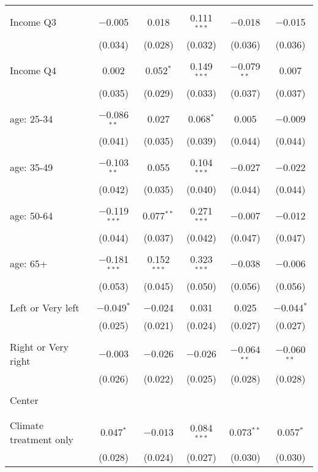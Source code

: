 \begin{tabular}{@{\extracolsep{5pt}}lccccc}
  & & & & & \\ 
 Income Q3 & $-$0.005 & 0.018 & 0.111$^{***}$ & $-$0.018 & $-$0.015 \\ 
  & (0.034) & (0.028) & (0.032) & (0.036) & (0.036) \\ 
  & & & & & \\ 
 Income Q4 & 0.002 & 0.052$^{*}$ & 0.149$^{***}$ & $-$0.079$^{**}$ & 0.007 \\ 
  & (0.035) & (0.029) & (0.033) & (0.037) & (0.037) \\ 
  & & & & & \\ 
 age: 25-34 & $-$0.086$^{**}$ & 0.027 & 0.068$^{*}$ & 0.005 & $-$0.009 \\ 
  & (0.041) & (0.035) & (0.039) & (0.044) & (0.044) \\ 
  & & & & & \\ 
 age: 35-49 & $-$0.103$^{**}$ & 0.055 & 0.104$^{***}$ & $-$0.027 & $-$0.022 \\ 
  & (0.042) & (0.035) & (0.040) & (0.044) & (0.044) \\ 
  & & & & & \\ 
 age: 50-64 & $-$0.119$^{***}$ & 0.077$^{**}$ & 0.271$^{***}$ & $-$0.007 & $-$0.012 \\ 
  & (0.044) & (0.037) & (0.042) & (0.047) & (0.047) \\ 
  & & & & & \\ 
 age: 65+ & $-$0.181$^{***}$ & 0.152$^{***}$ & 0.323$^{***}$ & $-$0.038 & $-$0.006 \\ 
  & (0.053) & (0.045) & (0.050) & (0.056) & (0.056) \\ 
  & & & & & \\ 
 Left or Very left & $-$0.049$^{*}$ & $-$0.024 & 0.031 & 0.025 & $-$0.044$^{*}$ \\ 
  & (0.025) & (0.021) & (0.024) & (0.027) & (0.027) \\ 
  & & & & & \\ 
 Right or Very right & $-$0.003 & $-$0.026 & $-$0.026 & $-$0.064$^{**}$ & $-$0.060$^{**}$ \\ 
  & (0.026) & (0.022) & (0.025) & (0.028) & (0.028) \\ 
  & & & & & \\ 
 Center &  &  &  &  &  \\ 
  &  &  &  &  &  \\ 
  & & & & & \\ 
 Climate treatment only & 0.047$^{*}$ & $-$0.013 & 0.084$^{***}$ & 0.073$^{**}$ & 0.057$^{*}$ \\ 
  & (0.028) & (0.024) & (0.027) & (0.030) & (0.030) \\ 

\end{tabular}
